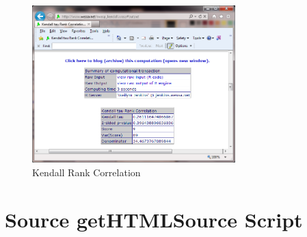 \documentclass[letterpaper,11pt]{report}
\begin{document}
\begin{savenotes}
\begin{figure}[htbp]
	\centering
		\includegraphics[width=0.70\textwidth]{Kendall.png}
	\caption{Kendall Rank Correlation}
	\label{fig:Kendall}
\end{figure}


\end{savenotes}




\appendix
{}

\chapter{Source getHTMLSource Script} \label{chap:getHTML}

\end{document}
